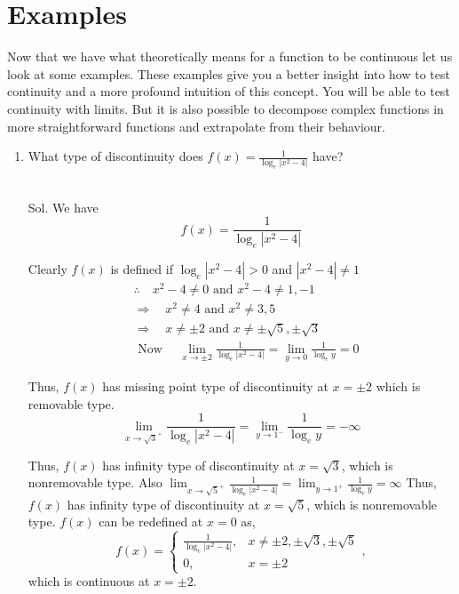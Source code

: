 \section{Examples}

Now that we have what theoretically means for a function to be continuous let us look at some examples. These examples give you a better insight into how to test continuity and a more profound intuition of this concept. You will be able to test continuity with limits. But it is also possible to decompose complex functions in more straightforward functions and extrapolate from their behaviour.

\begin{enumerate}
    \item What type of discontinuity does $f(x)=\frac{1}{\log _e\left|x^2-4\right|}$ have?\\\\

\begin{outline}
    Sol. We have
$$
f(x)=\frac{1}{\log _e\left|x^2-4\right|}
$$

Clearly $f(x)$ is defined if $\log _e\left|x^2-4\right|>0$ and $\left|x^2-4\right| \neq 1$
$$
\begin{aligned}
& \therefore \quad x^2-4 \neq 0 \text { and } x^2-4 \neq 1,-1 \\
& \Rightarrow \quad x^2 \neq 4 \text { and } x^2 \neq 3,5 \\
& \Rightarrow \quad x \neq \pm 2 \text { and } x \neq \pm \sqrt{5}, \pm \sqrt{3} \\
& \text { Now } \quad \lim _{x \rightarrow \pm 2} \frac{1}{\log _e\left|x^2-4\right|}=\lim _{y \rightarrow 0} \frac{1}{\log _e y}=0
\end{aligned}
$$

Thus, $f(x)$ has missing point type of discontinuity at $x= \pm 2$ which is removable type.
$$
\lim _{x \rightarrow \sqrt{3}^{+}} \frac{1}{\log _e\left|x^2-4\right|}=\lim _{y \rightarrow 1^{-}} \frac{1}{\log _e y}=-\infty
$$

Thus, $f(x)$ has infinity type of discontinuity at $x=\sqrt{3}$, which is nonremovable type.
Also $\lim _{x \rightarrow \sqrt{5}^{+}} \frac{1}{\log _e\left|x^2-4\right|}=\lim _{y \rightarrow 1^{+}} \frac{1}{\log _e y}=\infty$
Thus, $f(x)$ has infinity type of discontinuity at $x=\sqrt{5}$, which is nonremovable type.
$f(x)$ can be redefined at $x=0$ as,
$$
f(x)=\left\{\begin{array}{ll}
\frac{1}{\log _e\left|x^2-4\right|}, & x \neq \pm 2, \pm \sqrt{3}, \pm \sqrt{5} \\
0, & x= \pm 2
\end{array},\right.
$$
which is continuous at $x= \pm 2$.
\end{outline}



\end{enumerate}
